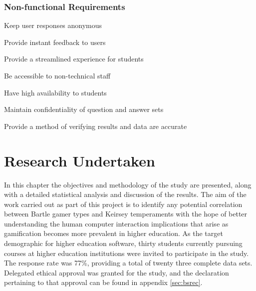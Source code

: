 \documentclass[12pt,a4paper,twoside]{report}
\begin{document}
\subsection{Non-functional Requirements}
Keep user responses anonymous
\begin{quote}
	
\end{quote}
Provide instant feedback to users
\begin{quote}
\end{quote}
Provide a streamlined experience for students
\begin{quote}
\end{quote}
Be accessible to non-technical staff
\begin{quote}
\end{quote}
Have high availability to students
\begin{quote}
\end{quote}
Maintain confidentiality of question and answer sets
\begin{quote}
\end{quote}
Provide a method of verifying results and data are accurate
\begin{quote}
\end{quote}

\chapter{Research Undertaken}
\label{sec:research}
In this chapter the objectives and methodology of the study are presented, along with a detailed statistical analysis and discussion of the results. The aim of the work carried out as part of this project is to identify any potential correlation between Bartle gamer types and Keirsey temperaments with the hope of better understanding the human computer interaction implications that arise as gamification becomes more prevalent in higher education. As the target demographic for higher education software, thirty students currently pursuing courses at higher education institutions were invited to participate in the study. The response rate was 77\%, providing a total of twenty three complete data sets. Delegated ethical approval was granted for the study, and the declaration pertaining to that approval can be found in appendix \ref{sec:bsrec}.
\end{document}
